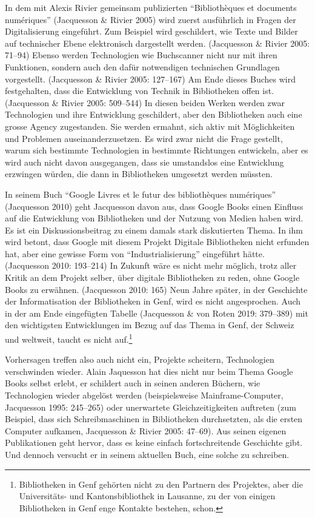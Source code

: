 \documentclass[a4paper,
fontsize=11pt,
oneside,
numbers=noperiodatend,
parskip=half-,
bibliography=totoc,
final
]{scrartcl}
\begin{document}
In dem mit Alexis Rivier gemeinsam publizierten \enquote{Bibliothèques
et documents numériques} (Jacquesson \& Rivier 2005) wird zuerst
ausführlich in Fragen der Digitalisierung eingeführt. Zum Beispiel wird
geschildert, wie Texte und Bilder auf technischer Ebene elektronisch
dargestellt werden. (Jacquesson \& Rivier 2005: 71--94) Ebenso werden
Technologien wie Buchscanner nicht nur mit ihren Funktionen, sondern
auch den dafür notwendigen technischen Grundlagen vorgestellt.
(Jacquesson \& Rivier 2005: 127--167) Am Ende dieses Buches wird
festgehalten, dass die Entwicklung von Technik in Bibliotheken offen
ist. (Jacquesson \& Rivier 2005: 509--544) In diesen beiden Werken werden
zwar Technologien und ihre Entwicklung geschildert, aber den
Bibliotheken auch eine grosse Agency zugestanden. Sie werden ermahnt,
sich aktiv mit Möglichkeiten und Problemen auseinanderzusetzen. Es wird
zwar nicht die Frage gestellt, warum sich bestimmte Technologien in
bestimmte Richtungen entwickeln, aber es wird auch nicht davon
ausgegangen, dass sie umstandslos eine Entwicklung erzwingen würden, die
dann in Bibliotheken umgesetzt werden müssten.

In seinem Buch \enquote{Google Livres et le futur des bibliothèques
numériques} (Jacquesson 2010) geht Jacquesson davon aus, dass Google
Books einen Einfluss auf die Entwicklung von Bibliotheken und der
Nutzung von Medien haben wird. Es ist ein Diskussionsbeitrag zu einem
damals stark diskutierten Thema. In ihm wird betont, dass Google mit
diesem Projekt Digitale Bibliotheken nicht erfunden hat, aber eine
gewisse Form von \enquote{Industrialisierung} eingeführt hätte.
(Jacquesson 2010: 193--214) In Zukunft wäre es nicht mehr möglich, trotz
aller Kritik an dem Projekt selber, über digitale Bibliotheken zu reden,
ohne Google Books zu erwähnen. (Jacquesson 2010: 165) Neun Jahre später,
in der Geschichte der Informatisation der Bibliotheken in Genf, wird es
nicht angesprochen. Auch in der am Ende eingefügten Tabelle (Jacquesson
\& von Roten 2019: 379--389) mit den wichtigsten Entwicklungen im Bezug
auf das Thema in Genf, der Schweiz und weltweit, taucht es nicht
auf.\footnote{Bibliotheken in Genf gehörten nicht zu den Partnern des
  Projektes, aber die Universitäts- und Kantonsbibliothek in Lausanne,
  zu der von einigen Bibliotheken in Genf enge Kontakte bestehen, schon.}

Vorhersagen treffen also auch nicht ein, Projekte scheitern,
Technologien verschwinden wieder. Alain Jaquesson hat dies nicht nur
beim Thema Google Books selbst erlebt, er schildert auch in seinen
anderen Büchern, wie Technologien wieder abgelöst werden (beispielsweise
Mainframe-Computer, Jacquesson 1995: 245--265) oder unerwartete
Gleichzeitigkeiten auftreten (zum Beispiel, dass sich Schreibmaschinen
in Bibliotheken durchsetzten, als die ersten Computer aufkamen,
Jacquesson \& Rivier 2005: 47--69). Aus seinen eigenen Publikationen geht
hervor, dass es keine einfach fortschreitende Geschichte gibt. Und
dennoch versucht er in seinem aktuellen Buch, eine solche zu schreiben.
\end{document}
